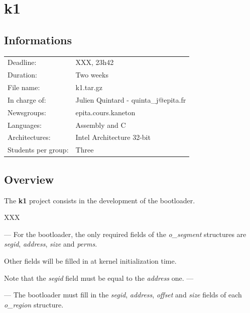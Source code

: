 
%
%

\section{k1}

%
%

\subsection{Informations}

\begin{tabular}{p{7cm}l}
Deadline: & XXX, 23h42 \\
Duration: & Two weeks \\
File name: & k1.tar.gz \\
In charge of: & Julien Quintard - \small{quinta\_j@epita.fr} \\
Newsgroups: & epita.cours.kaneton \\
Languages: & Assembly and C \\
Architectures: & Intel Architecture 32-bit \\
Students per group: & Three \\
\end{tabular}

%
%

\subsection{Overview}

The \textbf{k1} project consists in the development of the bootloader.

XXX

---
    For the bootloader, the only required fields of the \textit{o\_segment}
    structures are \textit{segid}, \textit{address}, \textit{size} and
    \textit{perms}.

    Other fields will be filled in at kernel initialization time.

    Note that the \textit{segid} field must be equal to the
    \textit{address} one.
---

---
    The bootloader must fill in the \textit{segid}, \textit{address},
    \textit{offset} and \textit{size} fields of each \textit{o\_region}
    structure.

